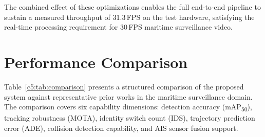 The combined effect of these optimizations enables the full end-to-end pipeline to sustain a measured throughput of 31.3\,FPS on the test hardware, satisfying the real-time processing requirement for 30\,FPS maritime surveillance video.

\section{Performance Comparison}

Table~\ref{c5:tab:comparison} presents a structured comparison of the 
proposed system against representative prior works in the maritime 
surveillance domain. The comparison covers six capability dimensions: 
detection accuracy (mAP\textsubscript{50}), tracking robustness (MOTA), 
identity switch count (IDS), trajectory prediction error (ADE), 
collision detection capability, and AIS sensor fusion support.

\begin{table}[H]
\fontsize{9}{11}\selectfont
\centering
\caption{Comprehensive comparison of the proposed system with prior 
maritimesurveillance works}
\label{c5:tab:comparison}
\end{table}

